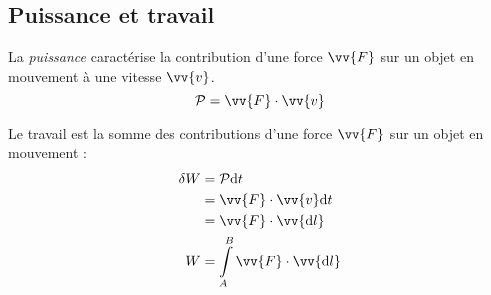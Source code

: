 \documentclass[11pt,a4paper,fleqn,pdftex]{report}
\begin{document}
\subsection{Puissance et travail}
\begin{dfn}
La \emph{puissance} caractérise la contribution d'une force $\vv{F}$ sur un objet en mouvement à une vitesse $\vv{v}$.
\begin{equation}
\mathcal{P} = \vv{F} \cdot \vv{v}
\end{equation}
\end{dfn}
%
\begin{dfn}
Le travail est la somme des contributions d'une force $\vv{F}$ sur un objet en mouvement : 
\begin{align}
\delta W &= \mathcal{P} \d t \\
         &= \vv{F} \cdot \vv{v} \d t \nonumber \\
         &= \vv{F} \cdot \vv{\d l} \nonumber \\
       W &= \int \limits_A^B \vv{F} \cdot \vv{\d l}
\end{align}
\end{dfn}
%
\end{document}

